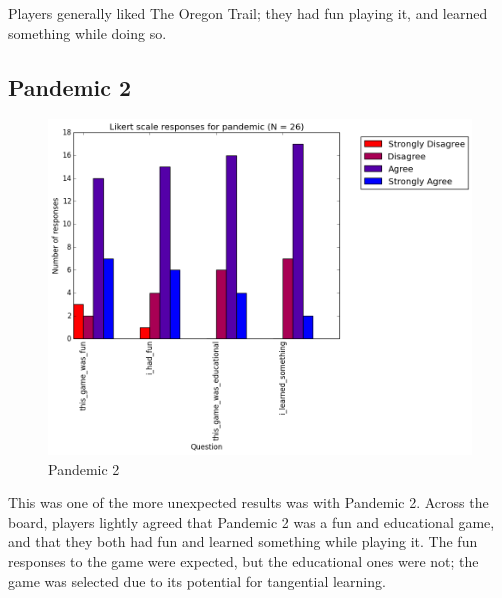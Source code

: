 				Players generally liked The Oregon Trail; they had fun playing it, and learned something while doing so.

			\subsection{Pandemic 2}

				\begin{figure}[] 
				\centering 
				\includegraphics[width=\textwidth, height=.4\textheight, keepaspectratio=true]{pandemic_likert.png} 
				\caption{Pandemic 2}
				\end{figure}

				This was one of the more unexpected results was with Pandemic 2. Across the board, players lightly agreed that Pandemic 2 was a fun and educational game, and that they both had fun and learned something while playing it. The fun responses to the game were expected, but the educational ones were not; the game was selected due to its potential for tangential learning.

			\clearpage

